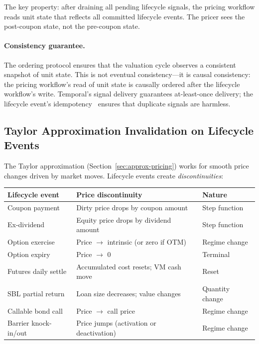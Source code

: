 \documentclass[11pt,a4paper]{article}
\begin{document}
\noindent The key property: after draining all pending lifecycle signals, the pricing workflow reads unit state that reflects all committed lifecycle events.  The pricer sees the post-coupon state, not the pre-coupon state.

\paragraph{Consistency guarantee.}  The ordering protocol ensures that the valuation cycle observes a consistent snapshot of unit state.  This is not eventual consistency---it is causal consistency: the pricing workflow's read of unit state is causally ordered after the lifecycle workflow's write.  Temporal's signal delivery guarantees at-least-once delivery; the lifecycle event's idempotency~\cite[\S7.1.2]{ledger} ensures that duplicate signals are harmless.

\subsection{Taylor Approximation Invalidation on Lifecycle Events}
\label{sec:taylor-invalidation}

The Taylor approximation (Section~\ref{sec:approx-pricing}) works for smooth price changes driven by market moves.  Lifecycle events create \emph{discontinuities}:

\begin{center}
\small
\begin{tabular}{l l l}
\toprule
\textbf{Lifecycle event} & \textbf{Price discontinuity} & \textbf{Nature} \\
\midrule
Coupon payment & Dirty price drops by coupon amount & Step function \\
Ex-dividend & Equity price drops by dividend amount & Step function \\
Option exercise & Price $\to$ intrinsic (or zero if OTM) & Regime change \\
Option expiry & Price $\to$ 0 & Terminal \\
Futures daily settle & Accumulated cost resets; VM cash move & Reset \\
SBL partial return & Loan size decreases; value changes & Quantity change \\
Callable bond call & Price $\to$ call price & Regime change \\
Barrier knock-in/out & Price jumps (activation or deactivation) & Regime change \\
\bottomrule
\end{tabular}
\end{center}
\end{document}
